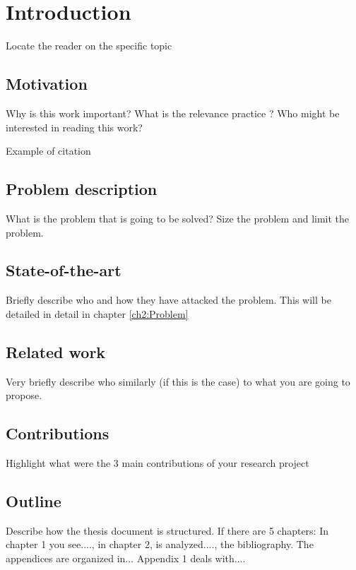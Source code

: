 


\chapter{Introduction} \label{ch1:Intro}


Locate the reader on the specific topic

\section{Motivation}
\label{ch1:Motivation}

Why is this work important? 
What is the relevance practice ? 
Who might be interested in reading this work?

Example of citation \cite{Meir95}

\section{Problem description}
\label{ch1:Problem}

What is the problem that is going to be solved? 
Size the problem and
limit the problem.

 
\section{State-of-the-art}
\label{ch1:Problem}

Briefly describe who and how they have attacked the problem.
This will be detailed in detail in chapter \ref{ch2:Problem}

\section{Related work}
\label{ch1:RWork}

Very briefly describe who similarly (if this is the
case) to what you are going to propose.

\section{Contributions}
\label{ch1:Contributions}

Highlight what were the 3 main contributions of your research project

\section{Outline}
\label{ch1:Outline}

Describe how the thesis document is structured. 
If there are 5 chapters: In chapter 1 you see...., in chapter 2,
is analyzed...., the bibliography.
The appendices are organized in... Appendix 1 deals with....

\newpage
